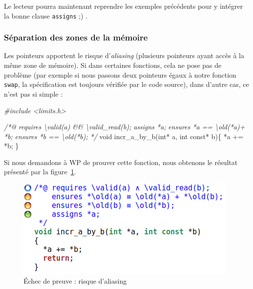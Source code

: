 \documentclass[12pt,francais,]{scrbook}
\newenvironment{Shaded}{}{}
\newcommand{\DataTypeTok}[1]{\textcolor[rgb]{0.56,0.13,0.00}{{#1}}}
\newcommand{\CommentTok}[1]{\textcolor[rgb]{0.38,0.63,0.69}{\textit{{#1}}}}
\newcommand{\NormalTok}[1]{{#1}}
\begin{document}
Le lecteur pourra maintenant reprendre les exemples précédents pour y
intégrer la bonne clause \texttt{assigns} ;) .

\subsubsection{Séparation des zones de la
mémoire}\label{suxe9paration-des-zones-de-la-muxe9moire}

Les pointeurs apportent le risque d'\emph{aliasing} (plusieurs pointeurs
ayant accès à la même zone de mémoire). Si dans certaines fonctions,
cela ne pose pas de problème (par exemple si nous passons deux pointeurs
égaux à notre fonction \texttt{swap}, la spécification est toujours
vérifiée par le code source), dans d'autre cas, ce n'est pas si simple :



\begin{footnotesize}\begin{Shaded}
\begin{Highlighting}[]
\CommentTok{#include <limits.h>}

\CommentTok{/*@}
\CommentTok{  requires \textbackslash{}valid(a) && \textbackslash{}valid_read(b);}
\CommentTok{  assigns  *a;}
\CommentTok{  ensures  *a == \textbackslash{}old(*a)+ *b;}
\CommentTok{  ensures  *b == \textbackslash{}old(*b);}
\CommentTok{*/}
\DataTypeTok{void} \NormalTok{incr_a_by_b(}\DataTypeTok{int}\NormalTok{* a, }\DataTypeTok{int} \DataTypeTok{const}\NormalTok{* b)\{}
  \NormalTok{*a += *b;}
\NormalTok{\}}
\end{Highlighting}
\end{Shaded}\end{footnotesize}

Si nous demandons à WP de prouver cette fonction, nous obtenons le
résultat présenté par la figure~\ref{fig:2-2-2-incr_a_by_b-1}.

\begin{figure}[htbp]
\centering
\includegraphics[scale=0.5]{2-2-2-incr_a_by_b-1.png}
\caption{Échec de preuve : risque d'aliasing}
\label{fig:2-2-2-incr_a_by_b-1}
\end{figure}
\end{document}
